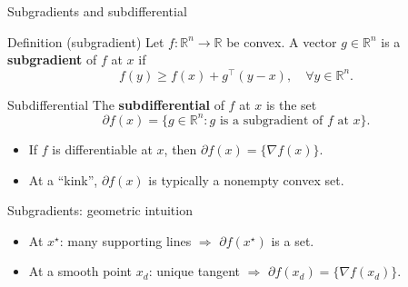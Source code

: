 \documentclass[aspectratio=169]{beamer}
\begin{document}
\begin{frame}{Subgradients and subdifferential}
\begin{block}{Definition (subgradient)}
Let $f:\mathbb{R}^n \to \mathbb{R}$ be convex.  
A vector $g \in \mathbb{R}^n$ is a \textbf{subgradient} of $f$ at $x$ if
\[
f(y) \ge f(x) + g^\top (y-x), \quad \forall y \in \mathbb{R}^n.
\]
\end{block}
\pause

\begin{block}{Subdifferential}
The \textbf{subdifferential} of $f$ at $x$ is the set
\[
\partial f(x) = \{ g \in \mathbb{R}^n : g \text{ is a subgradient of } f \text{ at } x \}.
\]
\end{block}
\pause
\begin{itemize}
    \item If $f$ is differentiable at $x$, then $\partial f(x) = \{ \nabla f(x)\}$.
    \item At a “kink”, $\partial f(x)$ is typically a nonempty convex set.
\end{itemize}
\end{frame}

\begin{frame}{Subgradients: geometric intuition}
\begin{center}
\end{center}

\begin{itemize}
\item At $x^\star$: many supporting lines $\Rightarrow$ $\partial f(x^\star)$ is a set.
\item At a smooth point $x_d$: unique tangent $\Rightarrow$ $\partial f(x_d)=\{\nabla f(x_d)\}$.
\end{itemize}

\end{frame}
\end{document}

